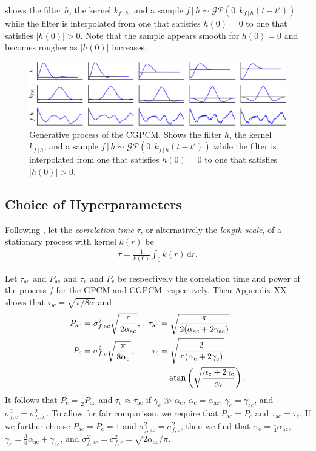 \documentclass{article}
\newcommand{\atan}{\operatorname{atan}}
\renewcommand{\ss}[1]{_\text{#1}}         %
\newcommand{\id}[1]{\, \mathrm{d} #1}     %
\newcommand{\cond}{\, | \,}               %
\renewcommand{\ll}{\left}
\newcommand{\rr}{\right}
\newcommand{\phan}[1]{\hphantom{#1\;}}
\begin{document}
 shows the filter $h$, the kernel $k_{f\cond h}$, and a sample $f\cond h \sim \mathcal{GP}(0,k_{f\cond h}(t-t'))$ while the filter is interpolated from one that satisfies $h(0)=0$ to one that satisfies $|h(0)|>0$. Note that the sample appears smooth for $h(0)=0$ and becomes rougher as $|h(0)|$ increases.

\begin{figure}[t]
    \vskip 0.1in
    \centering
    \includegraphics[width=\linewidth]{resources/cropped/interpolation.pdf}
    \caption{Generative process of the CGPCM. Shows the filter $h$, the kernel $k_{f\cond h}$, and a sample $f\cond h \sim \mathcal{GP}(0,k_{f\cond h}(t-t'))$ while the filter is interpolated from one that satisfies $h(0)=0$ to one that satisfies $|h(0)|>0$.}
    \label{fig:interpolation}
\end{figure}

\subsection{Choice of Hyperparameters}
Following \citet{Pavliotis:2012:Probabilistic_Perspective}, let the \textit{correlation time} $\tau$, or alternatively the \textit{length scale}, of a stationary process with kernel $k(r)$ be
\begin{align*}
    \tau = \frac{1}{k(0)}\int_0 k(r) \id{r}.
\end{align*}

Let $\tau\ss{ac}$ and $P\ss{ac}$ and $\tau\ss{c}$ and $P\ss{c}$ be respectively the correlation time and power of the process $f$ for the GPCM and CGPCM respectively. Then Appendix XX shows that $\tau_w=\sqrt{\pi/8 \alpha}$ and
\begin{align*}
    P\ss{ac} &= \sigma_{f,\text{ac}}^2\sqrt{\frac{\pi}{2\alpha\ss{ac}}},
    &\tau\ss{ac} &= \sqrt{\frac{\pi}{2(\alpha\ss{ac} + 2 \gamma\ss{ac})}}  \\
    P\ss{c} &= \sigma_{f,\text{c}}^2\sqrt{\frac{\pi}{8\alpha\ss{c}}},
    &\tau\ss{c} &= \sqrt{\frac{2}{\pi(\alpha\ss{c} + 2 \gamma\ss{c})}} \\
    &&&\phan{=}\atan\ll( \sqrt{\frac{\alpha\ss{c} + 2 \gamma\ss{c}}{\alpha\ss{c}}} \rr). \\
\end{align*}
It follows that $P\ss{c}=\frac{1}{2}P\ss{ac}$ and $\tau\ss{c}\approx \tau\ss{ac}$ if $\gamma\ss{c} \gg \alpha\ss{c}$, $\alpha\ss{c}=\alpha\ss{ac}$, $\gamma\ss{c}=\gamma\ss{ac}$, and $\sigma_{f,\text{c}}^2=\sigma_{f,\text{ac}}^2$. To allow for fair comparison, we require that $P\ss{ac}=P\ss{c}$ and $\tau\ss{ac}=\tau\ss{c}$. If we further choose $P\ss{ac}=P\ss{c}=1$ and $\sigma_{f,\text{ac}}^2=\sigma_{f,\text{c}}^2$, then we find that $\alpha\ss{c}=\frac{1}{4}\alpha\ss{ac}$, $\gamma\ss{c}=\frac{3}{8}\alpha\ss{ac}+ \gamma\ss{ac}$, and $\sigma_{f,\text{ac}}^2 = \sigma_{f,\text{c}}^2 = \sqrt{2\alpha\ss{ac}/\pi}$.
\end{document}
